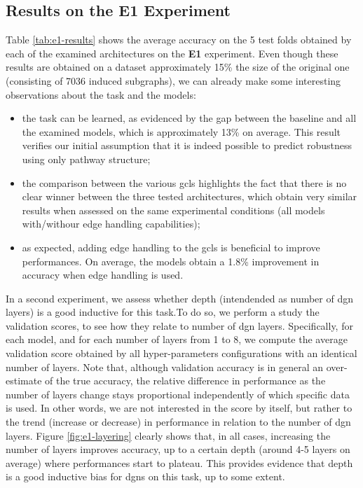 \subsection{Results on the E1 Experiment}
Table \ref{tab:e1-results} shows the average accuracy on the 5 test folds obtained by each of the examined architectures on the \textbf{E1} experiment. Even though these results are obtained on a dataset approximately 15\% the size of the original one (consisting of 7036 induced subgraphs), we can already make some interesting observations about the task and the models:
\begin{itemize}
    \item the task can be learned, as evidenced by the gap between the baseline and all the examined models, which is approximately 13\% on average. This result verifies our initial assumption that it is indeed possible to predict robustness using only pathway structure;
    \item the comparison between the various \glspl{gcl} highlights the fact that there is no clear winner between the three tested architectures, which obtain very similar results when assessed on the same experimental conditions (\ie all models with/withour edge handling capabilities);
    \item as expected, adding edge handling to the \glspl{gcl} is beneficial to improve performances. On average, the models obtain a 1.8\% improvement in accuracy when edge handling is used.
\end{itemize}



In a second experiment, we assess whether depth (intendended as number of \gls{dgn} layers) is a good inductive for this task.To do so, we perform a \posthoc study the validation scores, to see how they relate to number of \gls{dgn} layers. Specifically, for each model, and for each number of layers from 1 to 8, we compute the average validation score obtained by all hyper-parameters configurations with an identical number of layers. Note that, although validation accuracy is in general an over-estimate of the true accuracy, the relative difference in performance as the number of layers change stays proportional independently of which specific data is used. In other words, we are not interested in the score by itself, but rather to the trend (increase or decrease) in performance in relation to the number of \gls{dgn} layers. Figure \ref{fig:e1-layering} clearly shows that, in all cases, increasing the number of layers improves accuracy, up to a certain depth (around 4-5 layers on average) where performances start to plateau. This provides evidence that depth is a good inductive bias for \glspl{dgn} on this task, up to some extent.

